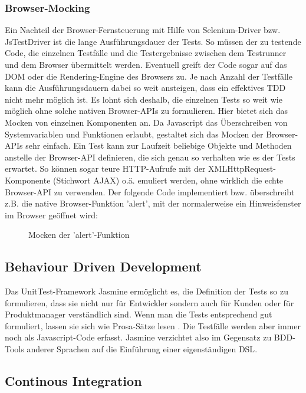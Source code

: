 \subsubsection{Browser-Mocking}
Ein Nachteil der Browser-Fernsteuerung mit Hilfe von Selenium-Driver bzw. JsTestDriver ist die lange Ausführungsdauer der Tests. So müssen der zu testende Code, die einzelnen Testfälle und die Testergebnisse zwischen dem Testrunner und dem Browser übermittelt werden. Eventuell greift der Code sogar auf das \ac{DOM} oder die Rendering-Engine des Browsers zu. Je nach Anzahl der Testfälle kann die Ausführungsdauern dabei so weit ansteigen, dass ein effektives \ac{TDD} nicht mehr möglich ist. Es lohnt sich deshalb, die einzelnen Tests so weit wie möglich ohne solche nativen Browser-APIs zu formulieren. Hier bietet sich das Mocken von einzelnen Komponenten an. Da Javascript das Überschreiben von Systemvariablen und Funktionen erlaubt, gestaltet sich das Mocken der Browser-APIs sehr einfach. Ein Test kann zur Laufzeit beliebige Objekte und Methoden anstelle der Browser-API definieren, die sich genau so verhalten wie es der Tests erwartet. So können sogar teure HTTP-Aufrufe mit der XMLHttpRequest-Komponente (Stichwort AJAX) o.ä. emuliert werden, ohne wirklich die echte Browser-API zu verwenden. Der folgende Code implementiert bzw. überschreibt z.B. die native Browser-Funktion 'alert', mit der normalerweise ein Hinweisfenster im Browser geöffnet wird:

\begin{figure}[H]
	\begin{center}
		\caption{Mocken der 'alert'-Funktion}
		\label{code:mocking}
	\end{center}
\end{figure}

\subsection{Behaviour Driven Development}
Das UnitTest-Framework Jasmine ermöglicht es, die Definition der Tests so zu formulieren, dass sie nicht nur für Entwickler sondern auch für Kunden oder für Produktmanager verständlich sind. Wenn man die Tests entsprechend gut formuliert, lassen sie sich wie Prosa-Sätze lesen \citep[Vgl.][]{Pivotal13}. Die Testfälle werden aber immer noch als Javascript-Code erfasst. Jasmine verzichtet also im Gegensatz zu BDD-Tools anderer Sprachen auf die Einführung einer eigenständigen \ac{DSL}.

\subsection{Continous Integration}

